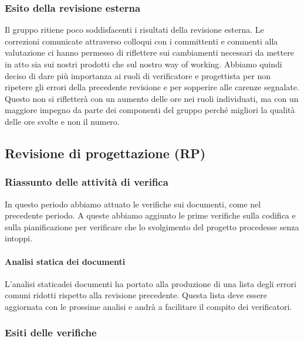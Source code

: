 \subsubsection{Esito della revisione esterna}
Il gruppo ritiene poco soddisfacenti i risultati della revisione esterna. 
Le correzioni comunicate attraverso colloqui con i committenti e commenti alla valutazione ci hanno permesso di riflettere sui cambiamenti necessari da mettere in atto sia sui nostri prodotti che sul nostro way of working\glo.
Abbiamo quindi deciso di dare più importanza ai ruoli di verificatore e progettista per non ripetere gli errori della precedente revisione e per sopperire alle carenze segnalate.
Questo non si rifletterà con un aumento delle ore nei ruoli individuati, ma con un maggiore impegno da parte dei componenti del gruppo perché migliori la qualità delle ore svolte e non il numero.

\subsection{Revisione di progettazione (RP)}
\subsubsection{Riassunto delle attività di verifica}
In questo periodo abbiamo attuato le verifiche sui documenti, come nel precedente periodo. A queste abbiamo aggiunto le prime verifiche sulla codifica e sulla pianificazione per verificare che lo svolgimento del progetto procedesse senza intoppi.  
\paragraph{Analisi statica dei documenti}
L'analisi statica\glosp dei documenti ha portato alla produzione di una lista degli errori comuni ridotti rispetto alla revisione precedente. Questa lista deve essere aggiornata con le prossime analisi e andrà a facilitare il compito dei verificatori.
\subsubsection{Esiti delle verifiche} 
